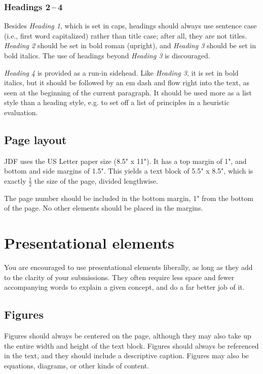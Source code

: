 \documentclass[
	letterpaper, %
]{jdf}
\begin{document}
\subsubsection{Headings 2\,–\,4}
Besides \emph{Heading 1}, which is set in caps, headings should always use sentence case (i.e., first word capitalized) rather than title case; after all, they are not titles. 
\emph{Heading 2} should be set in bold roman (upright), and \emph{Heading 3} should be set in bold italics. The use of headings beyond \emph{Heading 3} is discouraged.

\emph{Heading 4} is provided as a run-in sidehead. Like \emph{Heading 3}, it is set in bold italics, but it should be followed by an em dash and flow right into the text, 
as seen at the beginning of the current paragraph. It should be used more as a list style than a heading style, e.g. to set off a list of principles in a heuristic evaluation.

\subsection{Page layout}
JDF uses the US Letter paper size (8.5" x 11"). It has a top margin of 1", and bottom and side margins of 1.5". This yields a text block of 5.5" x 8.5", which is 
exactly \(\frac{1}{2}\) the size of the page, divided lengthwise.

The page number should be included in the bottom margin, 1" from the bottom of the page. No other elements should be placed in the margins.

\section{Presentational elements}
You are encouraged to use presentational elements liberally, as long as they add to the clarity of your submissions. They often require less space and fewer accompanying 
words to explain a given concept, and do a far better job of it.

\subsection{Figures}
Figures should always be centered on the page, although they may also take up the entire width and height of the text block. Figures should always be referenced in the text, 
and they should include a descriptive caption. Figures may also be equations, diagrams, or other kinds of content.
\end{document}
